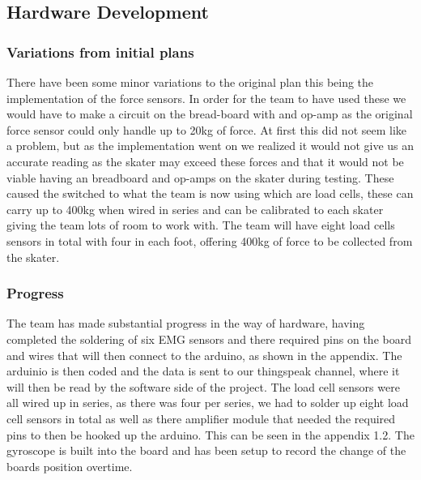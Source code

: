 \subsection{Hardware Development}
\subsubsection{Variations from initial plans}
There have been some minor variations to the original plan this being the implementation of the force sensors. In order for the team to have used these we would have to make a circuit on the bread-board with and op-amp as the original force sensor could only handle up to 20kg of force. At first this did not seem like a problem, but as the implementation went on we realized it would not give us an accurate reading as the skater may exceed these forces and that it would not be viable having an breadboard and op-amps on the skater during testing. These caused the switched to what the team is now using which are load cells, these can carry up to 400kg when wired in series and can be calibrated to each skater giving the team lots of room to work with. The team will have eight load cells sensors in total with four in each foot, offering 400kg of force to be collected from the skater. 
\subsubsection{Progress}
The team has made substantial progress in the way of hardware, having completed the soldering of six EMG sensors and there required pins on the board and wires that will then connect to the arduino, as shown in the appendix. The arduinio is then coded and the data is sent to our thingspeak channel, where it will then be read by the software side of the project. The load cell sensors were all wired up in series, as there was four per series, we had to solder up eight load cell sensors in total as well as there amplifier module that needed the required pins to then be hooked up the arduino. This can be seen in the appendix 1.2. The gyroscope is built into the board and has been setup to record the change of the boards position overtime.   
